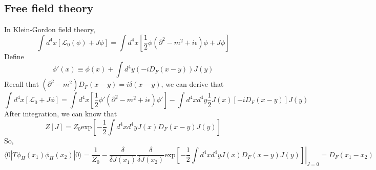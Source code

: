 \documentclass[cyan]{elegantnote}
\begin{document}
\subsection{Free field theory}
\noindent
In Klein-Gordon field theory,
\[\int d^4x [\mathcal{L}_0(\phi)+J\phi] = \int d^4x [\frac{1}{2}\phi (\partial^2 -m^2+i\epsilon)\phi + J\phi]\]
Define
\[\phi'(x) \equiv \phi(x) + \int d^4y (-iD_F(x-y)) J(y) \]
Recall that $(\partial^2-m^2)D_F(x-y) = i\delta(x-y)$, we can derive that
\[\int d^4x [\mathcal{L}_0+J\phi] = \int d^4x [\frac{1}{2}\phi' (\partial^2 -m^2+i\epsilon)\phi'] - \int d^4x d^4y \frac{1}{2} J(x)[-iD_F(x-y)]J(y)\]
After integration, we can know that
\[Z[J] = Z_0 \mathrm{exp} [-\frac{1}{2} \int d^4x d^4y J(x)D_F(x-y)J(y)]\]
So,
\[\langle 0 | T \phi_H(x_1) \phi_H(x_2) | 0 \rangle =  \frac{1}{Z_0}- \frac{\delta}{\delta J(x_1)} \frac{\delta}{\delta J(x_2)} \mathrm{exp} \left. \left[-\frac{1}{2} \int d^4x d^4y J(x)D_F(x-y)J(y)\right] \right |_{J=0} = D_F(x_1-x_2)\]
\end{document}
